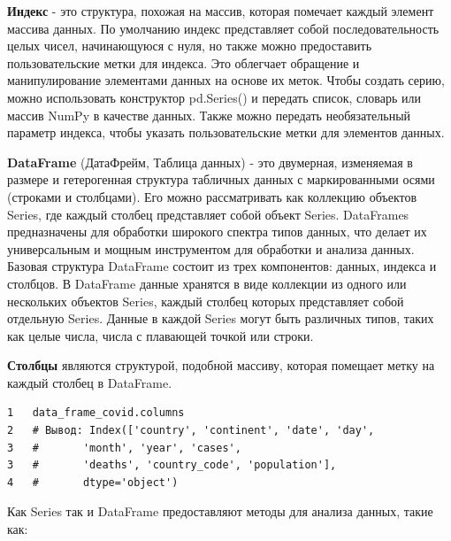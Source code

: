 \documentclass[12pt, a4paper]{article}
\begin{document}
{\textbf{Индекс} - это структура, похожая на массив, которая помечает 
каждый элемент массива данных. По умолчанию индекс представляет 
собой последовательность целых чисел, начинающуюся с нуля, но 
также можно предоставить пользовательские метки для индекса. 
Это облегчает обращение и манипулирование элементами данных на 
основе их меток. Чтобы создать серию, можно использовать 
конструктор pd.Series() и передать список, словарь или массив 
NumPy в качестве данных. Также можно передать необязательный 
параметр индекса, чтобы указать пользовательские метки для 
элементов данных.

\vspace{1em}

\textbf{DataFrame} (ДатаФрейм, Таблица данных) - это двумерная, 
изменяемая в размере и гетерогенная структура табличных данных 
с маркированными осями (строками и столбцами). Его можно 
рассматривать как коллекцию объектов Series, где каждый 
столбец представляет собой объект Series. DataFrames 
предназначены для обработки широкого спектра типов данных, 
что делает их универсальным и мощным инструментом для обработки 
и анализа данных. Базовая структура DataFrame состоит из трех 
компонентов: данных, индекса и столбцов.
В DataFrame данные хранятся в виде коллекции из одного или 
нескольких объектов Series, каждый столбец которых представляет 
собой отдельную Series. Данные в каждой Series могут быть 
различных типов, таких как целые числа, числа с плавающей точкой 
или строки.

\vspace{1em}

\textbf{Столбцы} являются структурой, подобной массиву, которая 
помещает метку на каждый столбец в DataFrame.

\begin{verbatim}
1   data_frame_covid.columns
2   # Вывод: Index(['country', 'continent', 'date', 'day', 
3   #       'month', 'year', 'cases',
3   #       'deaths', 'country_code', 'population'],
4   #       dtype='object')
\end{verbatim}

Как Series так и DataFrame предоставляют методы для анализа 
данных, такие как:

}
\end{document}
